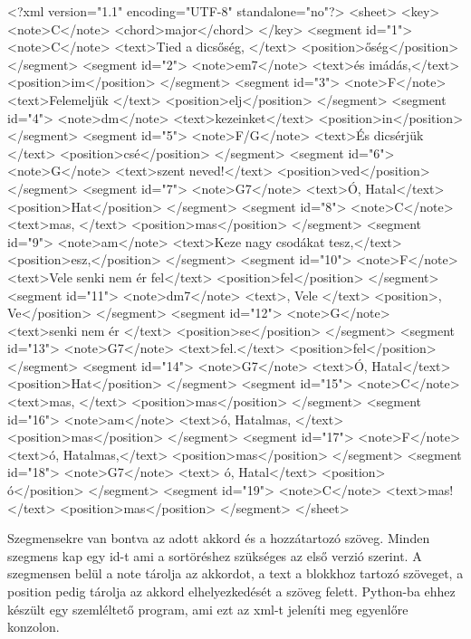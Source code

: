 \begin{xml}
	<?xml version="1.1" encoding="UTF-8" standalone="no"?>
	<sheet>
	<key>
	<note>C</note>
	<chord>major</chord>
	</key>
	<segment id="1">
	<note>C</note>
	<text>Tied a dicsőség, </text>
	<position>őség</position>
	</segment>
	<segment id="2">
	<note>em7</note>
	<text>és imádás,\n</text>
	<position>im</position>
	</segment>
	<segment id="3">
	<note>F</note>
	<text>Felemeljük </text>
	<position>elj</position>
	</segment>
	<segment id="4">
	<note>dm</note>
	<text>kezeinket\n</text>
	<position>in</position>
	</segment>
	<segment id="5">
	<note>F/G</note>
	<text>És dicsérjük </text>
	<position>csé</position>
	</segment>
	<segment id="6">
	<note>G</note>
	<text>szent neved!\n</text>
	<position>ved</position>
	</segment>
	<segment id="7">
	<note>G7</note>
	<text>Ó, Hatal</text>
	<position>Hat</position>
	</segment>
	<segment id="8">
	<note>C</note>
	<text>mas, </text>
	<position>mas</position>
	</segment>
	<segment id="9">
	<note>am</note>
	<text>Keze nagy csodákat tesz,\n</text>
	<position>esz,</position>
	</segment>
	<segment id="10">
	<note>F</note>
	<text>Vele senki nem ér fel</text>
	<position>fel</position>
	</segment>
	<segment id="11">
	<note>dm7</note>
	<text>, Vele </text>
	<position>, Ve</position>
	</segment>
	<segment id="12">
	<note>G</note>
	<text>senki nem ér </text>
	<position>se</position>
	</segment>
	<segment id="13">
	<note>G7</note>
	<text>fel.\n</text>
	<position>fel</position>
	</segment>
	<segment id="14">
	<note>G7</note>
	<text>Ó, Hatal</text>
	<position>Hat</position>
	</segment>
	<segment id="15">
	<note>C</note>
	<text>mas, </text>
	<position>mas</position>
	</segment>
	<segment id="16">
	<note>am</note>
	<text>ó, Hatalmas, </text>
	<position>mas</position>
	</segment>
	<segment id="17">
	<note>F</note>
	<text>ó, Hatalmas,</text>
	<position>mas</position>
	</segment>
	<segment id="18">
	<note>G7</note>
	<text> ó, Hatal</text>
	<position> ó</position>
	</segment>
	<segment id="19">
	<note>C</note>
	<text>mas!</text>
	<position>mas</position>
	</segment>
	</sheet>
	
\end{xml}

Szegmensekre van bontva az adott akkord és a hozzátartozó szöveg. Minden szegmens kap egy id-t ami a sortöréshez szükséges az első verzió szerint. A szegmensen belül a note tárolja az akkordot, a text a blokkhoz tartozó szöveget, a position pedig tárolja az akkord elhelyezkedését a szöveg felett. Python-ba ehhez készült egy szemléltető program, ami ezt az xml-t jeleníti meg egyenlőre konzolon.

